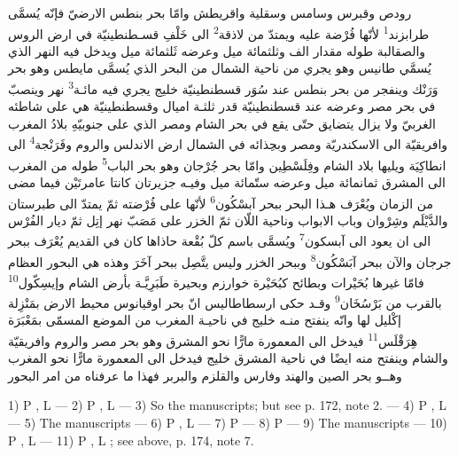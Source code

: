 \documentclass[11pt]{article}
\newcommand{\Pg}[1]{\marginpar{\footnotesize\color{gray}#1}}
\begin{document}
\Pg{I 175}\par\begin{Arabic}\ArNote رودص وقبرس وسامس وسقلية واقريطش وامّا بحر بنطس الارضيّ فإنّه يُسمَّى طرابزند\textsuperscript{1} لأنّها فُرْضة عليه ويمتدّ من لاذقة\textsuperscript{2} الى خَلْفِ قسـطنطينيّة في ارض الروس والصقالبة طوله مقدار الف وثلثمائة ميل وعرضه ثَلثمائة ميل ويدخل فيه النهر الذي يُسمَّي طانيس وهو يجري من ناحية الشمال من البحر الذي يُسمَّى مايطس وهو بحر وَرَنْك وينفجر من بحر بنطس عند سُوَر قسطنطينيّة خليج يجري فيه مائـة\textsuperscript{3} نهر وينصبّ في بحر مصر وعرضه عند قسطنطينيّة قدر ثلثـة اميال وقسطنطينيّة هي على شاطئه الغربيّ ولا يزال يتضايق حتّى يقع في بحر الشام ومصر الذي على جنوبيّهِ بلادُ المغرب وافريقيّة الى الاسكندريّة ومصر وبحِذائه في الشمال ارض الاندلس والروم وفَرَنْجة\textsuperscript{4} الى انطاكِيَة ويليها بلاد الشام وفِلَسْطِين وامّا بحر جُرْجان وهو بحر الباب\textsuperscript{5} طوله من المغرب الى المشرق ثمانمائة ميل وعرضه ستّمائة ميل وفيـه جزيرتان كانتا عامرتَيْن فيما مضى من الزمان ويُعْرَف هـذا البحر ببحر آبسْكُون\textsuperscript{6} لأنّها على فُرْضته ثمّ يمتدّ الى طبرستان والدَّيْلَم وشِرْوان وباب الابواب وناحية اللّان ثمّ الخزر على مَصَبّ نهر إتِل ثمّ ديار الفُرْس الى ان يعود الى آبسكون\textsuperscript{7} ويُسمَّى باسم كلّ بُقْعة حاذاها كان في القديم يُعْرَف ببحر جرجان والآن ببحر آبَسْكُون\textsuperscript{8} وببحر الخزر وليس يتَّصِل ببحر آخَرَ وهذه هي البحور العظام فامّا غيرها بُحَيْرات وبطائح كبُحَيْرة خوارزم وبحيرة طَبَرِيَّـة بأرض الشام وإيسِكّول\textsuperscript{10} بالقرب من بَرْسُخَان\textsuperscript{9} وقـد حكى ارسطاطاليس انّ بحر اوقيانوس محيط الارض بمَنْزِلة إكْليل لها وانّه ينفتح منـه خليج في ناحيـة المغرب من الموضع المسمّى بمَعْبَرَة هِرَقْلَس\textsuperscript{11} فيدخل الى المعمورة مارًّا نحو المشرق وهو بحر مصر والروم وافريقيّة والشام وينفتح منه ايضًا في ناحية المشرق خليج فيدخل الى المعمورة مارًّا نحو المغرب وهــو بحر الصين والهند وفارس والقلزم والبربر فهذا ما عرفناه من امر البحور\end{Arabic}\par{}
\par 1) P , L  — 2) P , L  — 3) So the manuscripts; but see p. 172, note 2. — 4) P , L  — 5) The manuscripts  — 6) P , L  — 7) P  — 8) P  — 9) The manuscripts  — 10) P , L  — 11) P , L ; see above, p. 174, note 7.\par
\end{document}

